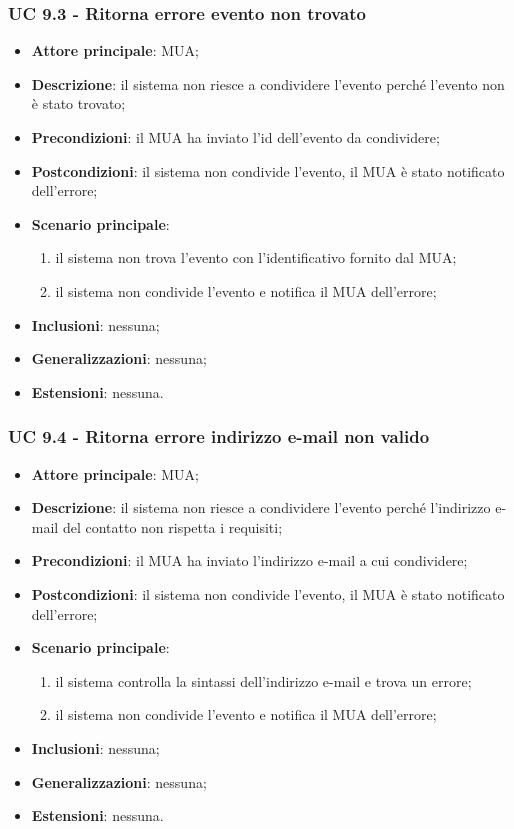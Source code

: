 \subsubsection{UC 9.3 - Ritorna errore evento non trovato} \label{sec:UC9.3}
    \begin{itemize}
        \item \textbf{Attore principale}: MUA;
        \item \textbf{Descrizione}: il sistema non riesce a condividere l'evento perché l'evento non è stato trovato;
        \item \textbf{Precondizioni}: il MUA ha inviato l'id dell'evento da condividere;
        \item \textbf{Postcondizioni}: il sistema non condivide l'evento, il MUA è stato notificato dell'errore;
        \item \textbf{Scenario principale}:
            \begin{enumerate}
                \item il sistema non trova l'evento con l'identificativo fornito dal MUA;
                \item il sistema non condivide l'evento e notifica il MUA dell'errore;
            \end{enumerate}
        \item \textbf{Inclusioni}: nessuna;
        \item \textbf{Generalizzazioni}: nessuna;
        \item \textbf{Estensioni}: nessuna.
    \end{itemize}

    \subsubsection{UC 9.4 - Ritorna errore indirizzo e-mail non valido} \label{sec:UC9.4}
    \begin{itemize}
        \item \textbf{Attore principale}: MUA;
        \item \textbf{Descrizione}: il sistema non riesce a condividere l'evento perché l'indirizzo e-mail del contatto non rispetta i requisiti;
        \item \textbf{Precondizioni}: il MUA ha inviato l'indirizzo e-mail a cui condividere;
        \item \textbf{Postcondizioni}: il sistema non condivide l'evento, il MUA è stato notificato dell'errore;
        \item \textbf{Scenario principale}:
            \begin{enumerate}
                \item il sistema controlla la sintassi dell'indirizzo e-mail e trova un errore;
                \item il sistema non condivide l'evento e notifica il MUA dell'errore;
            \end{enumerate}
        \item \textbf{Inclusioni}: nessuna;
        \item \textbf{Generalizzazioni}: nessuna;
        \item \textbf{Estensioni}: nessuna.
    \end{itemize}
